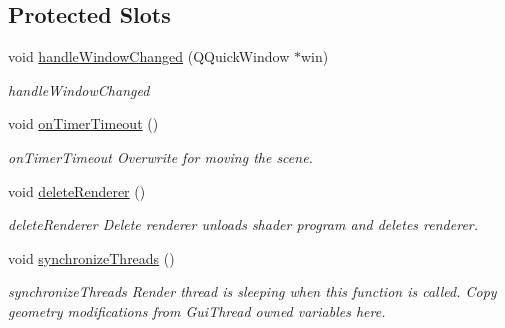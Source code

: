 \subsection*{Protected Slots}
\begin{DoxyCompactItemize}
\item 
void \mbox{\hyperlink{class_g_l_item_a95c8f2a7aa5d735bf73b7566fd4d12da}{handle\+Window\+Changed}} (Q\+Quick\+Window $\ast$win)
\begin{DoxyCompactList}\small\item\em handle\+Window\+Changed \end{DoxyCompactList}\item 
void \mbox{\hyperlink{class_g_l_item_acc7a813e42fb63bc6b7f2cf680b62717}{on\+Timer\+Timeout}} ()
\begin{DoxyCompactList}\small\item\em on\+Timer\+Timeout Overwrite for moving the scene. \end{DoxyCompactList}\item 
void \mbox{\hyperlink{class_g_l_item_a88da6fcb94651b2d45bda9527d7e64c9}{delete\+Renderer}} ()
\begin{DoxyCompactList}\small\item\em delete\+Renderer Delete renderer unloads shader program and deletes renderer. \end{DoxyCompactList}\item 
void \mbox{\hyperlink{class_g_l_item_a790da330a5b53f0156c144b68eff20c2}{synchronize\+Threads}} ()
\begin{DoxyCompactList}\small\item\em synchronize\+Threads Render thread is sleeping when this function is called. Copy geometry modifications from Gui\+Thread owned variables here. \end{DoxyCompactList}\end{DoxyCompactItemize}
